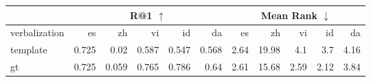 \begin{tabular}{|l|rrrrr|rrrrr|} 
 \hline & \multicolumn{5}{c|}{R@1 $\uparrow$} & \multicolumn{5}{c|}{Mean Rank $\downarrow$} \\
\hline
 verbalization   &    es &    zh &    vi &    id &    da &   es &    zh &   vi &   id &   da \\
\hline
 template        & 0.725 & 0.02  & 0.587 & 0.547 & 0.568 & 2.64 & 19.98 & 4.1  & 3.7  & 4.16 \\
 gt              & 0.725 & 0.059 & 0.765 & 0.786 & 0.64  & 2.61 & 15.68 & 2.59 & 2.12 & 3.84 \\
\hline
\end{tabular}